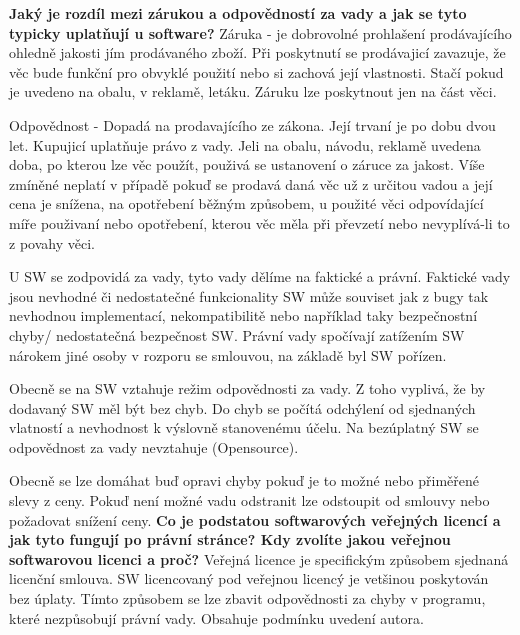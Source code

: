 \documentclass[12pt,a4paper,czech]{report}
\newcommand{\nadpis}[1]{\noindent\textbf{\Large{#1}}\normalsize}
\begin{document}
\newline
\newline
\nadpis{Jaký je rozdíl mezi zárukou a odpovědností za vady a jak se tyto typicky uplatňují u software?}
\newline
\newline
Záruka - je dobrovolné prohlašení prodávajícího ohledně jakosti jím prodávaného zboží. Při poskytnutí se prodávajicí zavazuje, že věc bude funkční pro obvyklé použití nebo si zachová její vlastnosti. Stačí pokud je uvedeno na obalu, v reklamě, letáku. Záruku lze poskytnout jen na část věci.

Odpovědnost - Dopadá na prodavajícího ze zákona. Její trvaní je po dobu dvou let. Kupujicí uplatňuje právo z vady. Jeli na obalu, návodu, reklamě uvedena doba, po kterou lze věc použít, použivá se ustanovení o záruce za jakost. Víše zmíněné neplatí v případě pokuď se prodavá daná věc už z určitou vadou a její cena je snížena, na opotřebení běžným způsobem, u použité věci odpovídající míře použivaní nebo opotřebení, kterou věc měla při převzetí nebo nevyplívá-li to z povahy věci.

U SW se zodpovidá za vady,  tyto vady dělíme na faktické a právní. Faktické vady jsou nevhodné či nedostatečné funkcionality SW může souviset jak z bugy tak nevhodnou implementací, nekompatibilitě nebo například taky bezpečnostní chyby/ nedostatečná bezpečnost SW. Právní vady spočívají zatížením SW nárokem jiné osoby v rozporu se smlouvou, na základě byl SW pořízen. 

Obecně se na SW vztahuje režim odpovědnosti za vady. Z toho vyplivá, že by dodavaný SW měl být bez chyb. Do chyb se počítá odchýlení od sjednaných vlatností a nevhodnost k výslovně stanovenému účelu. Na bezúplatný SW se odpovědnost za vady nevztahuje (Opensource). 

Obecně se lze domáhat buď opravi chyby pokuď je to možné nebo přiměřené slevy z ceny. Pokuď není možné vadu odstranit lze odstoupit od smlouvy nebo požadovat snížení ceny. 
\newline
\newline
\nadpis{Co je podstatou softwarových veřejných licencí a jak tyto fungují po právní stránce? Kdy zvolíte jakou veřejnou softwarovou licenci a proč?}
\newline
\newline
Veřejná licence je specifickým způsobem sjednaná licenční smlouva. SW licencovaný pod veřejnou licencý je vetšinou poskytován bez úplaty. Tímto způsobem se lze zbavit odpovědnosti za chyby v programu, které nezpůsobují právní vady. Obsahuje podmínku uvedení autora. 
\end{document}
